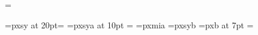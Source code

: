 \textfont\itfam=\PalatinoTextTen \def\it{\fam\itfam\PalatinoTextTen}%

\font\Simbolo=pxsy at 20pt\newfam\Famiglia\textfont\Famiglia=\Simbolo %
\font\SimboliSgamo=pxsya at 10pt
\newfam\Boxies\textfont\Boxies=\SimboliSgamo
\def\Box{\mathchar"\the\Boxies03}
\def\BBox{\mathchar"\the\Boxies04}
%
\font\Gotico=pxmia%
\font\Gruppi=pxsyb%
\font\CaptTitle=pxb at 7pt
\newfam\CaptFam
\textfont\CaptFam=\PalatinoMathSeven
\def\Caption{\fam\CaptFam\PalatinoTextSeven}
\hoffset 1cm
\hsize 13cm
\overfullrule 0pt
\newcount\chapN  %
\newcount\secN   %
\newcount\appN   %
\newcount\equatN %
\newcount\footN  %
\newcount\figN   %
\newcount{}   %
\newtoks\ChapMark%

